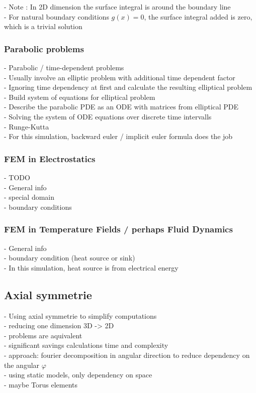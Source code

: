 \documentclass[parskip=half, titlepage=yes, 12pt, BCOR=12mm, DIV=calc]{scrartcl}
\begin{document}
- Note : In 2D dimension the surface integral is around the boundary line \\
- For natural boundary conditions $g(x) = 0$, the surface integral added is zero, which is a trivial solution \\

\subsubsection{Parabolic problems}
- Parabolic / time-dependent problems \\
- Usually involve an elliptic problem with additional time dependent factor \\

- Ignoring time dependency at first and calculate the resulting elliptical problem \\
- Build system of equations for elliptical problem \\

- Describe the parabolic PDE as an ODE with matrices from elliptical PDE \\
- Solving the system of ODE equations over discrete time intervalls \\
- Runge-Kutta \\
- For this simulation, backward euler / implicit euler formula does the job \\

\subsubsection{FEM in Electrostatics}
- TODO \\
- General info \\
- special domain \\
- boundary conditions \\

\subsubsection{FEM in Temperature Fields / perhaps Fluid Dynamics}
- General info \\
- boundary condition (heat source or sink) \\
- In this simulation, heat source is from electrical energy \\


\subsection{Axial symmetrie}
- Using axial symmetrie to simplify computations \\
- reducing one dimension 3D -> 2D \\
- problems are aquivalent \\
- significant savings calculations time and complexity \\
- approach: fourier decomposition in angular direction to reduce dependency on the angular $\varphi$ \\
- using static models, only dependency on space \\
- maybe Torus elements \\
\end{document}
